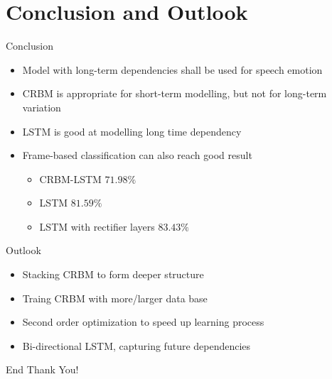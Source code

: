 \section{Conclusion and Outlook}
      \begin{frame}[t]{Conclusion}
	  \begin{itemize}
	  \itemsep10pt
	  \item Model with long-term dependencies shall be used for speech emotion
	  \item CRBM is appropriate for short-term modelling, but not for long-term variation
	  \item LSTM is good at modelling long time dependency 
	  \item Frame-based classification can also reach good result
		\vspace{5mm}
		\begin{itemize}
		 \itemsep10pt
		 \item CRBM-LSTM $71.98\%$
		 \item LSTM $81.59\%$
		 \item LSTM with rectifier layers $83.43\%$
		\end{itemize}
	  \end{itemize}
      \end{frame}
      
      \begin{frame}[t]{Outlook}
	  \begin{itemize}
	   \item Stacking CRBM to form deeper structure
	   \item Traing CRBM with more/larger data base 
	   \item Second order optimization to speed up learning process
	   \item Bi-directional LSTM, capturing future dependencies
	  \end{itemize}

      \end{frame}

      \begin{frame}{End}
	\Large Thank You!
      \end{frame}




